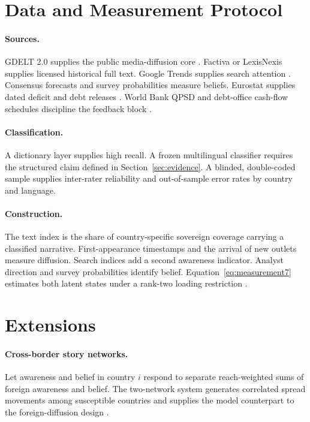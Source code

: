 \documentclass[11pt]{article}
\theoremstyle{definition}
\begin{document}
\section{Data and Measurement Protocol}\label{app:data}

\paragraph{Sources.} GDELT 2.0 supplies the public media-diffusion core \citep{GDELTData}. Factiva or LexisNexis supplies licensed historical full text. Google Trends supplies search attention \citep{GoogleTrendsData}. Consensus forecasts and survey probabilities measure beliefs. Eurostat supplies dated deficit and debt releases \citep{EurostatCalendar}. World Bank QPSD and debt-office cash-flow schedules discipline the feedback block \citep{WorldBankQPSD7}.

\paragraph{Classification.} A dictionary layer supplies high recall. A frozen multilingual classifier requires the structured claim defined in Section~\ref{sec:evidence}. A blinded, double-coded sample supplies inter-rater reliability and out-of-sample error rates by country and language.

\paragraph{Construction.} The text index is the share of country-specific sovereign coverage carrying a classified narrative. First-appearance timestamps and the arrival of new outlets measure diffusion. Search indices add a second awareness indicator. Analyst direction and survey probabilities identify belief. Equation~\eqref{eq:measurement7} estimates both latent states under a rank-two loading restriction \citep{AndreEtAl2026}.

\section{Extensions}\label{app:ext}

\paragraph{Cross-border story networks.} Let awareness and belief in country $i$ respond to separate reach-weighted sums of foreign awareness and belief. The two-network system generates correlated spread movements among susceptible countries and supplies the model counterpart to the foreign-diffusion design \citep{LongstaffEtAl2011}.
\end{document}
